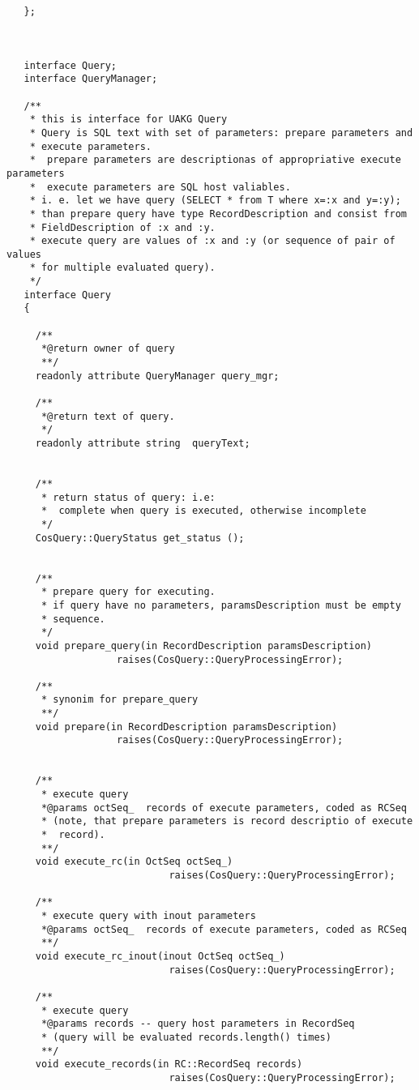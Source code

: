 \documentclass[10pt]{article}
\begin{document}
\begin{verbatim}
   };



   interface Query;
   interface QueryManager;

   /**
    * this is interface for UAKG Query
    * Query is SQL text with set of parameters: prepare parameters and 
    * execute parameters.
    *  prepare parameters are descriptionas of appropriative execute parameters
    *  execute parameters are SQL host valiables.
    * i. e. let we have query (SELECT * from T where x=:x and y=:y);
    * than prepare query have type RecordDescription and consist from
    * FieldDescription of :x and :y.
    * execute query are values of :x and :y (or sequence of pair of values
    * for multiple evaluated query).
    */
   interface Query
   {

     /**
      *@return owner of query
      **/
     readonly attribute QueryManager query_mgr;

     /**
      *@return text of query.
      */
     readonly attribute string  queryText;
 

     /**
      * return status of query: i.e: 
      *  complete when query is executed, otherwise incomplete
      */
     CosQuery::QueryStatus get_status ();


     /**
      * prepare query for executing.
      * if query have no parameters, paramsDescription must be empty 
      * sequence.
      */
     void prepare_query(in RecordDescription paramsDescription)
                   raises(CosQuery::QueryProcessingError);

     /**
      * synonim for prepare_query 
      **/
     void prepare(in RecordDescription paramsDescription)
                   raises(CosQuery::QueryProcessingError);


     /**
      * execute query
      *@params octSeq_  records of execute parameters, coded as RCSeq
      * (note, that prepare parameters is record descriptio of execute
      *  record).
      **/
     void execute_rc(in OctSeq octSeq_)
                            raises(CosQuery::QueryProcessingError);

     /**
      * execute query with inout parameters
      *@params octSeq_  records of execute parameters, coded as RCSeq
      **/
     void execute_rc_inout(inout OctSeq octSeq_)
                            raises(CosQuery::QueryProcessingError);
     
     /**
      * execute query
      *@params records -- query host parameters in RecordSeq
      * (query will be evaluated records.length() times)
      **/
     void execute_records(in RC::RecordSeq records)
                            raises(CosQuery::QueryProcessingError);


\end{verbatim}
\end{document}
